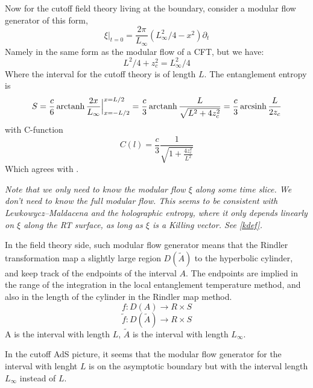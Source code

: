 \documentclass[11pt,a4paper]{article}
\begin{document}
	Now for the cutoff field theory living at the boundary, consider a modular flow generator of this form,
	\begin{equation}
	\xi|_{t=0}=\frac{2\pi}{L_\infty}(L_\infty^2/4-x^2)\partial_t
	\end{equation}
	Namely in the same form as the modular flow of a CFT, but we have:
	\begin{equation}
	L^2/4+z_c^2=L_\infty^2/4
	\end{equation}
	Where the interval for the cutoff theory is of length $L$. The entanglement entropy is
	\begin{equation}
	S=\frac{c}{6}\operatorname{arctanh}\frac{2x}{L_\infty}\Big|_{x=-L/2}^{x=L/2}
	=\frac{c}{3}\operatorname{arctanh}\frac{L}{\sqrt{L^2+4z_c^2}}
	=\frac{c}{3}\operatorname{arcsinh}\frac{L}{2z_c}
	\end{equation}
	with C-function
	\begin{equation}
	C(l)=\frac{c}{3}\frac{1}{\sqrt{1+\frac{4z_c^2}{L^2}}}
	\end{equation}
	Which agrees with \cite{Lewkowycz:2019xse}. 
	
	\textit{Note that we only need to know the modular flow $\xi$ along some time slice. We don't need to know the full modular flow. This seems to be consistent with Lewkowycz--Maldacena \cite{Lewkowycz:2013nqa} and the holographic entropy, where it only depends linearly on $\xi$ along the RT surface, as long as $\xi$ is a Killing vector. See \eqref{kdef}. }
	
	In the field theory side, such modular flow generator means that the Rindler transformation map a slightly large region $D(\tilde{A})$ to the hyperbolic cylinder, and keep track of the endpoints of the interval $A$. The endpoints are implied in the range of the integration in the local entanglement temperature method, and also in the length of the cylinder in the Rindler map method.
	\begin{equation}
	f:D(A)\rightarrow R\times S
	\end{equation}
	\begin{equation}
	\tilde{f}:D(\tilde{A})\rightarrow R\times S
	\end{equation}
	A is the interval with length $L$, $\tilde{A}$ is the interval with length $L_\infty$.
	
	In the cutoff AdS picture, it seems that the modular flow generator for the interval with lenght $L$ is on the asymptotic boundary but with the interval length $L_\infty$ instead of $L$.
	
\end{document}
